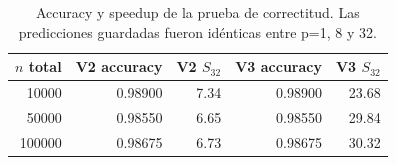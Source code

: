 \begin{table}[H]
\centering
\begin{tabular}{rrrrr}
\toprule
$n$ total & V2 accuracy & V2 $S_{32}$ & V3 accuracy & V3 $S_{32}$ \\
\midrule
10000 & 0.98900 & 7.34 & 0.98900 & 23.68 \\
50000 & 0.98550 & 6.65 & 0.98550 & 29.84 \\
100000 & 0.98675 & 6.73 & 0.98675 & 30.32 \\
\bottomrule
\end{tabular}
\caption{Accuracy y speedup de la prueba de correctitud. Las predicciones guardadas fueron idénticas entre p=1, 8 y 32.}
\label{tab:accuracy}
\end{table}
